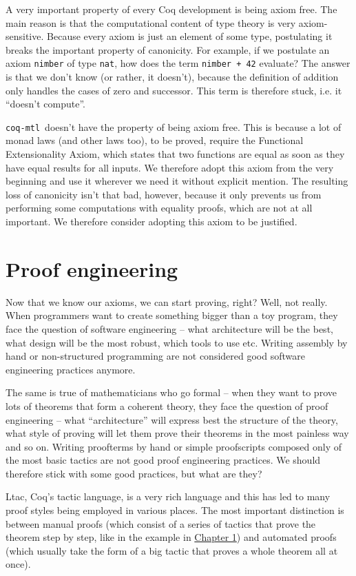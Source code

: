 \documentclass[declaration,inz,english,shortabstract]{iithesis}
\newcommand{\libname}{\m{coq-mtl}}
\newcommand{\m}[1]{\texttt{#1}}
\begin{document}
A very important property of every Coq development is being axiom free. The main reason is that the computational content of type theory is very axiom-sensitive. Because every axiom is just an element of some type, postulating it breaks the important property of canonicity. For example, if we postulate an axiom \m{nimber} of type \m{nat}, how does the term \m{nimber + 42} evaluate? The answer is that we don't know (or rather, it doesn't), because the definition of addition only handles the cases of zero and successor. This term is therefore stuck, i.e. it ``doesn't compute''.

\libname\ doesn't have the property of being axiom free. This is because a lot of monad laws (and other laws too), to be proved, require the Functional Extensionality Axiom, which states that two functions are equal as soon as they have equal results for all inputs. We therefore adopt this axiom from the very beginning and use it wherever we need it without explicit mention. The resulting loss of canonicity isn't that bad, however, because it only prevents us from performing some computations with equality proofs, which are not at all important. We therefore consider adopting this axiom to be justified.

\section{Proof engineering}

Now that we know our axioms, we can start proving, right? Well, not really. When programmers want to create something bigger than a toy program, they face the question of software engineering -- what architecture will be the best, what design will be the most robust, which tools to use etc. Writing assembly by hand or non-structured programming are not considered good software engineering practices anymore.

The same is true of mathematicians who go formal -- when they want to prove lots of theorems that form a coherent theory, they face the question of proof engineering -- what ``architecture'' will express best the structure of the theory, what style of proving will let them prove their theorems in the most painless way and so on. Writing proofterms by hand or simple proofscripts composed only of the most basic tactics are not good proof engineering practices. We should therefore stick with some good practices, but what are they?

Ltac, Coq's tactic language, is a very rich language and this has led to many proof styles being employed in various places. The most important distinction is between manual proofs (which consist of a series of tactics that prove the theorem step by step, like in the example in \hyperref[ch1]{Chapter 1}) and automated proofs (which usually take the form of a big tactic that proves a whole theorem all at once).
\end{document}
